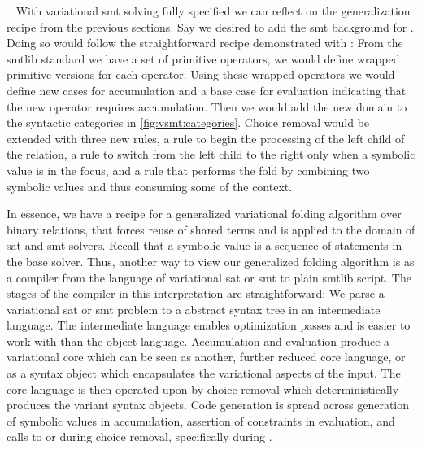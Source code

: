 ~\label{section:vsmt:arrays}
% 
With variational \ac{smt} solving fully specified we can reflect on the
generalization recipe from the previous sections. Say we desired to add the
\ac{smt} background for . Doing so would follow the straightforward
recipe demonstrated with : From the \acl{smtlib} standard we have a set
of primitive operators, we would define wrapped primitive versions for each
operator. Using these wrapped operators we would define new cases for
accumulation and a base case for evaluation indicating that the new operator
requires accumulation. Then we would add the new domain to the syntactic
categories in \autoref{fig:vsmt:categories}. Choice removal would be extended
with three new rules, a rule to begin the processing of the left child of the
relation, a rule to switch from the left child to the right only when a symbolic
value is in the focus, and a rule that performs the fold by combining two
symbolic values and thus consuming some of the context.

In essence, we have a recipe for a generalized variational folding algorithm
over binary relations, that forces reuse of shared terms and is applied to the
domain of \ac{sat} and \ac{smt} solvers. Recall that a symbolic value is a
sequence of statements in the base solver. Thus, another way to view our
generalized folding algorithm is as a compiler from the language of variational
\ac{sat} or \ac{smt} to plain \acl{smtlib} script. The stages of the compiler in
this interpretation are straightforward: We parse a variational \ac{sat} or
\ac{smt} problem to a abstract syntax tree in an intermediate language. The
intermediate language enables optimization passes and is easier to work with
than the object language. Accumulation and evaluation produce a variational core
which can be seen as another, further reduced core language, or as a syntax
object which encapsulates the variational aspects of the input. The core
language is then operated upon by choice removal which deterministically
produces the variant syntax objects. Code generation is spread across generation
of symbolic values in accumulation, assertion of constraints in evaluation, and
calls to  or  during choice removal, specifically during
\crChc.

